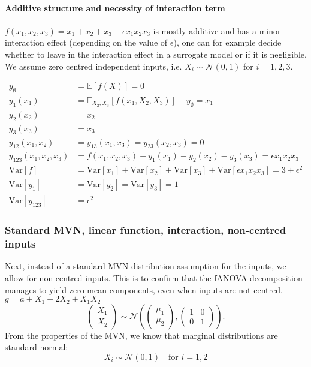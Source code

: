 \paragraph{Additive structure and necessity of interaction term}
$f(x_1, x_2, x_3) = x_1 + x_2 + x_3 + \epsilon x_1 x_2 x_3$ is mostly additive and has a minor interaction effect (depending on the value of $\epsilon$), one can for example decide whether to leave in the interaction effect in a surrogate model or if it is negligible.
We assume zero centred independent inputs, i.e. $X_i \sim \mathcal{N}(0, 1)$ for $i = 1, 2, 3$.

\begin{align*}
y_\emptyset &= \mathbb{E}[f(X)] = 0 \\
y_1(x_1) &= \mathbb{E}_{X_2, X_3}[f(x_1, X_2, X_3)] - y_\emptyset = x_1 \\
y_2(x_2) &= x_2 \\
y_3(x_3) &= x_3 \\
y_{12}(x_1, x_2) &= y_{13}(x_1, x_3) = y_{23}(x_2, x_3) = 0 \\
y_{123}(x_1, x_2, x_3) &= f(x_1, x_2, x_3) - y_1(x_1) - y_2(x_2) - y_3(x_3) = \epsilon x_1 x_2 x_3 \\
\mathrm{Var}[f] &= \mathrm{Var}[x_1] + \mathrm{Var}[x_2] + \mathrm{Var}[x_3] + \mathrm{Var}[\epsilon x_1 x_2 x_3] = 3 + \epsilon^2 \\
\mathrm{Var}[y_1] &= \mathrm{Var}[y_2] = \mathrm{Var}[y_3] = 1 \\
\mathrm{Var}[y_{123}] &= \epsilon^2
\end{align*}



\subsubsection*{Standard MVN, linear function, interaction, non-centred inputs}
Next, instead of a standard MVN distribution assumption for the inputs, we allow for non-centred inputs. This is to confirm that the fANOVA decomposition manages to yield zero mean components, even when inputs are not centred.
\(g = a + X_1 + 2X_2 + X_1 X_2\)
\[
\begin{pmatrix}
X_1 \\
X_2
\end{pmatrix}
\sim \mathcal{N}\left(
\begin{pmatrix} \mu_1 \\ \mu_2 \end{pmatrix},
\begin{pmatrix}
1 & 0 \\
0 & 1
\end{pmatrix}
\right).
\]
From the properties of the MVN, we know that marginal distributions are standard normal:
\[
X_i \sim \mathcal{N}(0, 1) \quad \text{for } i = 1, 2
\]

